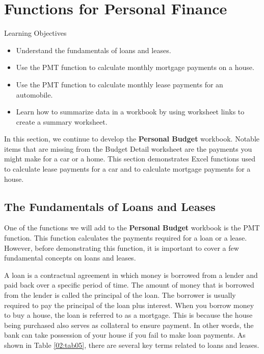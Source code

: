 \section{Functions for Personal Finance}\label{ch02.3:functions_personal}

\begin{center}
	\begin{objbox}{Learning Objectives}
		\begin{itemize}
			\setlength{\itemsep}{0pt}
			\setlength{\parskip}{0pt}
			\setlength{\parsep}{0pt}
			
			\item Understand the fundamentals of loans and leases.
			\item Use the PMT function to calculate monthly mortgage payments on a house.
			\item Use the PMT function to calculate monthly lease payments for an automobile.
			\item Learn how to summarize data in a workbook by using worksheet links to create a summary worksheet.

		\end{itemize}
	\end{objbox}
\end{center}

In this section, we continue to develop the \textbf{Personal Budget} workbook. Notable items that are missing from the Budget Detail worksheet are the payments you might make for a car or a home. This section demonstrates Excel functions used to calculate lease payments for a car and to calculate mortgage payments for a house.

\subsection{The Fundamentals of Loans and Leases}

One of the functions we will add to the \textbf{Personal Budget} workbook is the PMT function. This function calculates the payments required for a loan or a lease. However, before demonstrating this function, it is important to cover a few fundamental concepts on loans and leases.

A loan is a contractual agreement in which money is borrowed from a lender and paid back over a specific period of time. The amount of money that is borrowed from the lender is called the principal of the loan. The borrower is usually required to pay the principal of the loan plus interest. When you borrow money to buy a house, the loan is referred to as a mortgage. This is because the house being purchased also serves as collateral to ensure payment. In other words, the bank can take possession of your house if you fail to make loan payments. As shown in Table \ref{02:tab05}, there are several key terms related to loans and leases.


